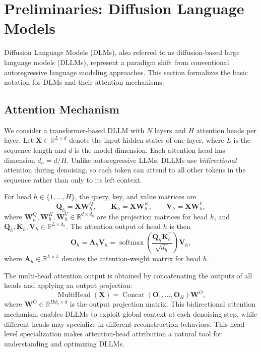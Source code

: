     \section{Preliminaries: Diffusion Language Models}
    \label{sec:preliminaries}

    Diffusion Language Models (DLMs), also referred to as diffusion-based large language models (DLLMs), represent a paradigm shift from conventional autoregressive language modeling approaches. This section formalizes the basic notation for DLMs and their attention mechanisms.

    \subsection{Attention Mechanism}

    We consider a transformer-based DLLM with $N$ layers and $H$ attention heads per layer. Let $\mathbf{X} \in \mathbb{R}^{L \times d}$ denote the input hidden states of one layer, where $L$ is the sequence length and $d$ is the model dimension. Each attention head has dimension $d_h = d / H$. Unlike autoregressive LLMs, DLLMs use \emph{bidirectional} attention during denoising, so each token can attend to all other tokens in the sequence rather than only to its left context.

    For head $h \in \{1,\dots,H\}$, the query, key, and value matrices are
    \begin{equation}
        \mathbf{Q}_h = \mathbf{X}\mathbf{W}_h^Q, \qquad
        \mathbf{K}_h = \mathbf{X}\mathbf{W}_h^K, \qquad
        \mathbf{V}_h = \mathbf{X}\mathbf{W}_h^V,
    \end{equation}
    where $\mathbf{W}_h^Q, \mathbf{W}_h^K, \mathbf{W}_h^V \in \mathbb{R}^{d \times d_h}$ are the projection matrices for head $h$, and $\mathbf{Q}_h,\mathbf{K}_h,\mathbf{V}_h \in \mathbb{R}^{L \times d_h}$. The attention output of head $h$ is then
    \begin{equation}
        \mathbf{O}_h = \mathbf{A}_h \mathbf{V}_h
        = \operatorname{softmax}\left(\frac{\mathbf{Q}_h \mathbf{K}_h^\top}{\sqrt{d_h}}\right)\mathbf{V}_h,
        \label{eq:attention}
    \end{equation}
    where $\mathbf{A}_h \in \mathbb{R}^{L \times L}$ denotes the attention-weight matrix for head $h$.

    The multi-head attention output is obtained by concatenating the outputs of all heads and applying an output projection:
    \begin{equation}
        \operatorname{MultiHead}(\mathbf{X}) =
        \operatorname{Concat}(\mathbf{O}_1,\dots,\mathbf{O}_H)\mathbf{W}^O,
    \end{equation}
    where $\mathbf{W}^O \in \mathbb{R}^{Hd_h \times d}$ is the output projection matrix. This bidirectional attention mechanism enables DLLMs to exploit global context at each denoising step, while different heads may specialize in different reconstruction behaviors. This head-level specialization makes attention-head attribution a natural tool for understanding and optimizing DLLMs.

